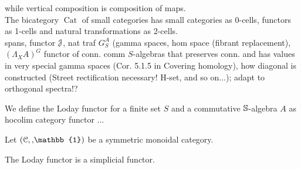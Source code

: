     while vertical composition is composition of maps.\\
    The bicategory $\operatorname{Cat}$ of small categories has small categories as 0-cells, functors as 1-cells and natural transformations as 2-cells.
    \\
    spans, functor $\mathcal{J}$, nat traf $G^A_S$ (gamma spaces, hom space (fibrant replacement), $(\Lambda_X A)^G$ functor of conn. comm $S$-algebras that preserves conn. and has values in very special gamma spaces (Cor. 5.1.5 in Covering homology), how diagonal is constructed (Street rectification necessary! H-set, and so on...); adapt to orthogonal spectra!?
    \begin{defn}\label{def_loday_functor}
      We define the Loday functor for a finite set $S$ and a commutative $\mathbb{S}$-algebra $A$ as hocolim category functor ...

    \end{defn}

    \begin{defn}\label{def_loday_functor_in_symmetric_monoidal_category}
      Let $(\mathcal{C},\smash, \mathbb{1})$ be a symmetric monoidal category.\\
    \end{defn}

    \begin{lem}\label{lem_loday_functor_is_simplicial}
      The Loday functor is a simplicial functor.\\
    \end{lem}
